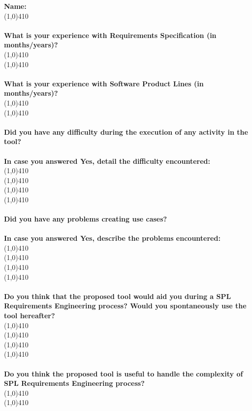 \textbf{Name:}
\\
\line(1,0){410}
\\
\\
\textbf{What is your experience with Requirements Specification (in months/years)?}
\\
\line(1,0){410}
\\
\line(1,0){410}
\\
\\
\textbf{What is your experience with Software Product Lines (in months/years)?}
\\
\line(1,0){410}
\\
\line(1,0){410}
\\
\\
\textbf{Did you have any difficulty during the execution of any activity in the tool?}
\\
\\
\textbf{In case you answered Yes, detail the difficulty encountered:}
\\
\line(1,0){410}
\\
\line(1,0){410}
\\
\line(1,0){410}
\\
\line(1,0){410}
\\
\\
\textbf{Did you have any problems creating use cases?}
\\
\\
\textbf{In case you answered Yes, describe the problems encountered:}
\\
\line(1,0){410}
\\
\line(1,0){410}
\\
\line(1,0){410}
\\
\line(1,0){410}
\\
\\
\textbf{Do you think that the proposed tool would aid you during a SPL Requirements Engineering process? Would you spontaneously use the tool hereafter?}
\\
\line(1,0){410}
\\
\line(1,0){410}
\\
\line(1,0){410}
\\
\line(1,0){410}
\\
\\
\textbf{Do you think the proposed tool is useful to handle the complexity of SPL Requirements Engineering process?}
\\
\line(1,0){410}
\\
\line(1,0){410}
\\

